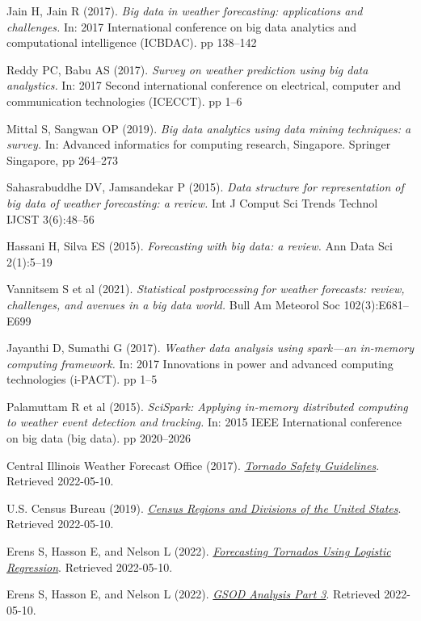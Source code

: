 \documentclass[conference]{IEEEtran}
\begin{document}
\begin{thebibliography}{9}

Jain H, Jain R (2017). \textit{Big data in weather forecasting: applications and challenges.} In: 2017 International conference on big data analytics and computational intelligence (ICBDAC). pp 138–142

Reddy PC, Babu AS (2017). \textit{Survey on weather prediction using big data analystics.} In: 2017 Second international conference on electrical, computer and communication technologies (ICECCT). pp 1–6

Mittal S, Sangwan OP (2019). \textit{Big data analytics using data mining techniques: a survey.} In: Advanced informatics for computing research, Singapore. Springer Singapore, pp 264–273

Sahasrabuddhe DV, Jamsandekar P (2015). \textit{Data structure for representation of big data of weather forecasting: a review.} Int J Comput Sci Trends Technol IJCST 3(6):48–56

Hassani H, Silva ES (2015). \textit{Forecasting with big data: a review.} Ann Data Sci 2(1):5–19

Vannitsem S et al (2021). \textit{Statistical postprocessing for weather forecasts: review, challenges, and avenues in a big data world.} Bull Am Meteorol Soc 102(3):E681–E699

Jayanthi D, Sumathi G (2017). \textit{Weather data analysis using spark—an in-memory computing framework.} In: 2017 Innovations in power and advanced computing technologies (i-PACT). pp 1–5

Palamuttam R et al (2015). \textit{SciSpark: Applying in-memory distributed computing to weather event detection and tracking.} In: 2015 IEEE International conference on big data (big data). pp 2020–2026

Central Illinois Weather Forecast Office (2017). \href{https://www.weather.gov/ilx/SvrPrepWeek-Tuesday}{\textit{Tornado Safety Guidelines}}. Retrieved 2022-05-10.

U.S. Census Bureau (2019). \href{https://www2.census.gov/geo/pdfs/maps-data/maps/reference/us\_regdiv.pdf}{\textit{Census Regions and Divisions of the United States}}. Retrieved 2022-05-10.

Erens S, Hasson E, and Nelson L (2022). \href{https://github.com/emilyhasson/gsod-analysis/blob/main/code/gsod-analysis-part-2.ipynb}{\textit{Forecasting Tornados Using Logistic Regression}}. Retrieved 2022-05-10.

Erens S, Hasson E, and Nelson L (2022). \href{https://github.com/emilyhasson/gsod-analysis/blob/main/code/gsod-analysis-part-3.ipynb}{\textit{GSOD Analysis Part 3}}. Retrieved 2022-05-10.

\end{thebibliography}
\end{document}
